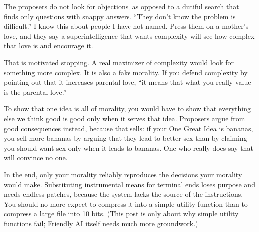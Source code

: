 The proposers do not look for objections, as opposed to a dutiful search that finds only questions with snappy answers. ``They don't know the problem is difficult.'' I know this about people I have not named. Press them on a mother's love, and they say a superintelligence that wants complexity will see how complex that love is and encourage it.

That is motivated stopping. A real maximizer of complexity would look for something more complex. It is also a fake morality. If you defend complexity by pointing out that it increases parental love, ``it means that what you really value is the parental love.''

To show that one idea is all of morality, you would have to show that everything else we think good is good only when it serves that idea.  Proposers argue from good consequences instead, because that sells: if your One Great Idea is bananas, you sell more bananas by arguing that they lead to better sex than by claiming you should want sex only when it leads to bananas. One who really does say that will convince no one.

In the end, only your morality reliably reproduces the decisions your morality would make. Substituting instrumental means for terminal ends loses purpose and needs endless patches, because the system lacks the source of the instructions. You should no more expect to compress it into a simple utility function than to compress a large file into 10 bits. (This post is only about why simple utility functions fail; Friendly AI itself needs much more groundwork.)
